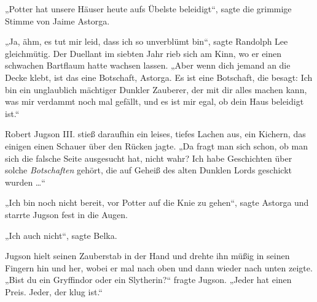 „Potter hat unsere Häuser heute aufs Übelste beleidigt“, sagte die grimmige Stimme von Jaime Astorga.

„Ja, ähm, es tut mir leid, dass ich so unverblümt bin“, sagte Randolph Lee gleichmütig. Der Duellant im siebten Jahr rieb sich am Kinn, wo er einen schwachen Bartflaum hatte wachsen lassen.
„Aber wenn dich jemand an die Decke klebt, ist das eine Botschaft, Astorga. Es ist eine Botschaft, die besagt: Ich bin ein unglaublich mächtiger Dunkler Zauberer, der mit dir alles machen kann, was mir verdammt noch mal gefällt, und es ist mir egal, ob dein Haus beleidigt ist.“

Robert Jugson III. stieß daraufhin ein leises, tiefes Lachen aus, ein Kichern, das einigen einen Schauer über den Rücken jagte.
„Da fragt man sich schon, ob man sich die falsche Seite ausgesucht hat, nicht wahr? Ich habe Geschichten über solche \emph{Botschaften} gehört, die auf Geheiß des alten Dunklen Lords geschickt wurden …“

„Ich bin noch nicht bereit, vor Potter auf die Knie zu gehen“, sagte Astorga und starrte Jugson fest in die Augen.

„Ich auch nicht“, sagte Belka.

Jugson hielt seinen Zauberstab in der Hand und drehte ihn müßig in seinen Fingern hin und her, wobei er mal nach oben und dann wieder nach unten zeigte.
„Bist du ein Gryffindor oder ein Slytherin?“ fragte Jugson.
„Jeder hat einen Preis. Jeder, der klug ist.“


